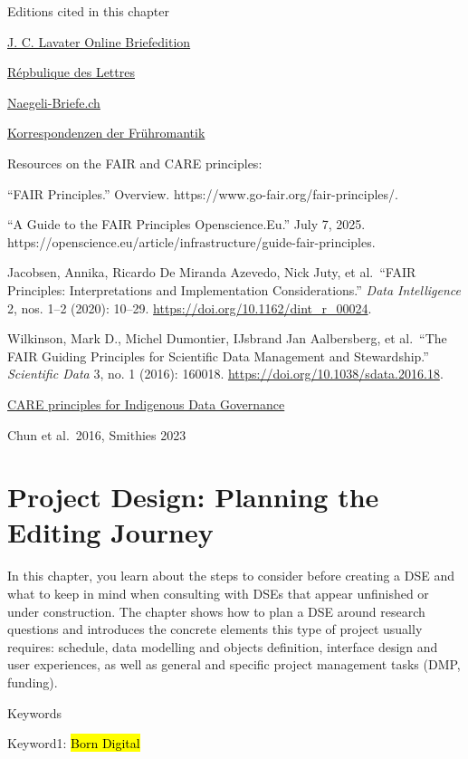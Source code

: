 \documentclass[
  letterpaper,
  DIV=11,
  numbers=noendperiod]{scrreprt}
\begin{document}
Editions cited in this chapter

\href{https://www.jclavater-briefwechsel.ch/about}{J. C. Lavater Online
Briefedition}

\href{https://republique-des-lettres.ch/about/guidelines}{Répbulique des
Lettres}

\href{https://naegeli-briefe.ch/home}{Naegeli-Briefe.ch}

\href{https://briefe-der-romantik.de/}{Korrespondenzen der Frühromantik}

Resources on the FAIR and CARE principles:

``FAIR Principles.'' Overview. https://www.go-fair.org/fair-principles/.

``A Guide to the FAIR Principles \textbar{} Openscience.Eu.'' July 7,
2025.
https://openscience.eu/article/infrastructure/guide-fair-principles.

Jacobsen, Annika, Ricardo De Miranda Azevedo, Nick Juty, et al.~``FAIR
Principles: Interpretations and Implementation Considerations.''
\emph{Data Intelligence} 2, nos. 1--2 (2020): 10--29.
\url{https://doi.org/10.1162/dint_r_00024}.

Wilkinson, Mark D., Michel Dumontier, IJsbrand Jan Aalbersberg, et
al.~``The FAIR Guiding Principles for Scientific Data Management and
Stewardship.'' \emph{Scientific Data} 3, no. 1 (2016): 160018.
\url{https://doi.org/10.1038/sdata.2016.18}.

\href{}{CARE principles for Indigenous Data Governance}

Chun et al.~2016, Smithies 2023


\chapter{Project Design: Planning the Editing
Journey}\label{project-design-planning-the-editing-journey}

In this chapter, you learn about the steps to consider before creating a
DSE and what to keep in mind when consulting with DSEs that appear
unfinished or under construction. The chapter shows how to plan a DSE
around research questions and introduces the concrete elements this type
of project usually requires: schedule, data modelling and objects
definition, interface design and user experiences, as well as general
and specific project management tasks (DMP, funding).

Keywords

Keyword1: \hl{Born Digital}
\end{document}
